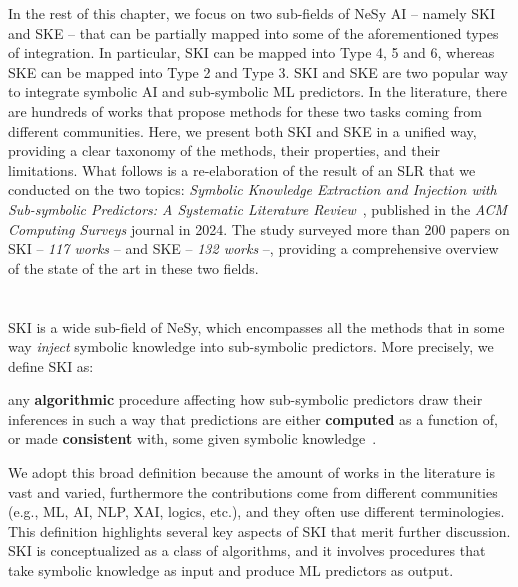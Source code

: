 In the rest of this chapter, we focus on two sub-fields of \gls{NeSy} \gls{AI} -- namely \gls{SKI} and \gls{SKE} -- that can be partially mapped into some of the aforementioned types of integration.
%
In particular, \gls{SKI} can be mapped into Type 4, 5 and 6, whereas \gls{SKE} can be mapped into Type 2 and Type 3.
%
\Gls{SKI} and \gls{SKE} are two popular way to integrate symbolic \gls{AI} and sub-symbolic \gls{ML} predictors.
%
In the literature, there are hundreds of works that propose methods for these two tasks coming from different communities.
%
Here, we present both \gls{SKI} and \gls{SKE} in a unified way, providing a clear taxonomy of the methods, their properties, and their limitations.
%
What follows is a re-elaboration of the result of an \gls{SLR} that we conducted on the two topics: \emph{Symbolic Knowledge Extraction and Injection with Sub-symbolic Predictors: A Systematic Literature Review}~\cite{DBLP:journals/csur/CiattoSAMO24}, published in the \emph{ACM Computing Surveys} journal in 2024.
%
The study surveyed more than 200 papers on \gls{SKI} -- \emph{117 works} -- and \gls{SKE} -- \emph{132 works} --, providing a comprehensive overview of the state of the art in these two fields.


\section[Symbolic knowledge injection]{}\label{sec:ski}
%
\Gls{SKI} is a wide sub-field of \gls{NeSy}, which encompasses all the methods that in some way \emph{inject} symbolic knowledge into sub-symbolic predictors.
%
More precisely, we define \gls{SKI} as:
%
\begin{definition}
    \label{def:ski}
    any \textbf{algorithmic} procedure affecting how sub-symbolic predictors draw their inferences in such a way that predictions are either \textbf{computed} as a function of, or made \textbf{consistent} with, some given symbolic knowledge~\cite{DBLP:journals/csur/CiattoSAMO24}.
\end{definition}
%
We adopt this broad definition because the amount of works in the literature is vast and varied, furthermore the contributions come from different communities (e.g., \gls{ML}, \gls{AI}, \gls{NLP}, \gls{XAI}, logics, etc.), and they often use different terminologies.
%
This definition highlights several key aspects of \gls{SKI} that merit further discussion.
%
\gls{SKI} is conceptualized as a class of algorithms, and it involves procedures that take symbolic knowledge as input and produce \gls{ML} predictors as output.

